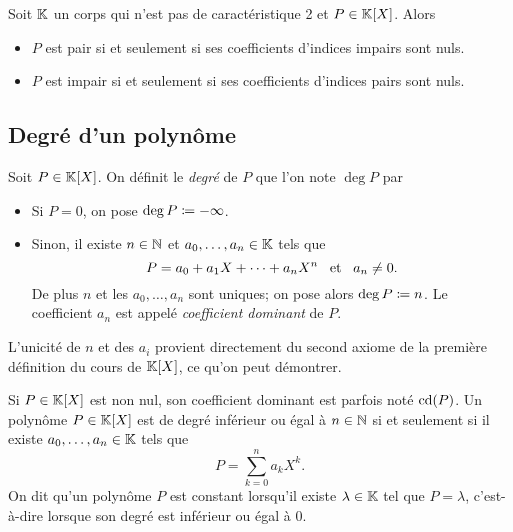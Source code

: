 \documentclass{magnolia}
\begin{document}
\begin{proposition}
Soit $\mathbb{K}$ un corps qui n'est pas de caractéristique 2 et $P\in\polyK$. Alors
\begin{itemize}
\item $P$ est pair si et seulement si ses coefficients d'indices impairs sont
  nuls.
\item $P$ est impair si et seulement si ses coefficients d'indices pairs sont
  nuls.
\end{itemize}
\end{proposition}


\subsection{Degré d'un polynôme}

\begin{definition}
Soit $P\in\polyK$. On définit le \emph{degré} de $P$ que l'on note $\deg P$ par
\begin{itemize}
\item Si $P=0$, on pose $\deg P\coloneqq -\infty$.
\item Sinon, il existe $n\in\mathbb{N}$ et $a_0,\ldots,a_n\in\mathbb{K}$ tels que
  \[P=a_0+a_1X+\cdots+a_n X^n \quad\!\text{et}\quad\! a_n\neq 0.\]
  De plus $n$ et les $a_0,\ldots,a_n$ sont uniques; on pose alors $\deg P\coloneqq n$.
  Le coefficient $a_n$ est appelé \emph{coefficient dominant} de $P$.
\end{itemize}
\end{definition}

\begin{preuve}
L'unicité de $n$ et des $a_i$ provient directement du second axiome de la première définition du cours de $\polyK$, ce qu'on peut démontrer.
\end{preuve}

\begin{remarques}
\remarque Si $P\in\polyK$ est non nul, son coefficient dominant est parfois noté
  ${\rm cd}(P)$.
\remarque Un polynôme $P\in\polyK$ est de degré inférieur ou égal à $n\in\mathbb{N}$
  si et seulement si il existe $a_0,\ldots,a_n\in\mathbb{K}$ tels que
  \[P=\sum_{k=0}^n a_k X^k.\]
\remarque On dit qu'un polynôme $P$ est constant lorsqu'il existe $\lambda\in\mathbb{K}$ tel
  que $P=\lambda$, c'est-à-dire lorsque son degré est inférieur ou égal à 0.
\end{remarques}
\end{document}
